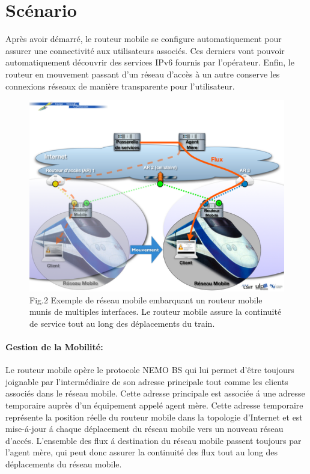 \documentclass[12pt,a4paper]{report}
\begin{document}
\newpage
\section{Sc\'{e}nario}

Apr\`{e}s avoir d\'{e}marr\'{e}, le routeur mobile se configure automatiquement pour assurer une connectivit\'{e} aux utilisateurs associ\'{e}s. Ces derniers vont pouvoir automatiquement d\'{e}couvrir des services IPv6 fournis par l'op\'{e}rateur. Enfin, le routeur en mouvement passant d'un r\'{e}seau d'acc\`{e}s à un autre conserve les connexions r\'{e}seaux de mani\`{e}re transparente pour l'utilisateur.
\begin{figure}[h]
\begin{center}
\includegraphics[scale=0.5]{R2}
\caption[9pt]{Fig.2 Exemple de r\'{e}seau mobile embarquant un routeur mobile munis de multiples interfaces. Le routeur mobile assure la continuit\'{e} de service tout au long des d\'{e}placements du train.}
\end{center}
\end{figure}

\newpage
\paragraph{Gestion de la Mobilit\'{e}:} 
Le routeur mobile op\`{e}re le protocole NEMO BS qui lui permet d'\^{e}tre toujours joignable par l'interm\'{e}diaire de son adresse principale tout comme les clients associ\'{e}s dans le r\'{e}seau mobile. Cette adresse principale est associ\'{e}e \'{a} une adresse temporaire aupr\`{e}s d'un \'{e}quipement appel\'{e} agent m\`{e}re. Cette adresse temporaire repr\'{e}sente la position r\'{e}elle du routeur mobile dans la topologie d'Internet et est mise-\'{a}-jour \'{a} chaque d\'{e}placement du r\'{e}seau mobile vers un nouveau r\'{e}seau d'acc\'{e}s.
L'ensemble des flux \'{a} destination du r\'{e}seau mobile passent toujours par l'agent m\`{e}re, qui peut donc assurer la continuit\'{e} des flux tout au long des d\'{e}placements du r\'{e}seau mobile.
\end{document}
